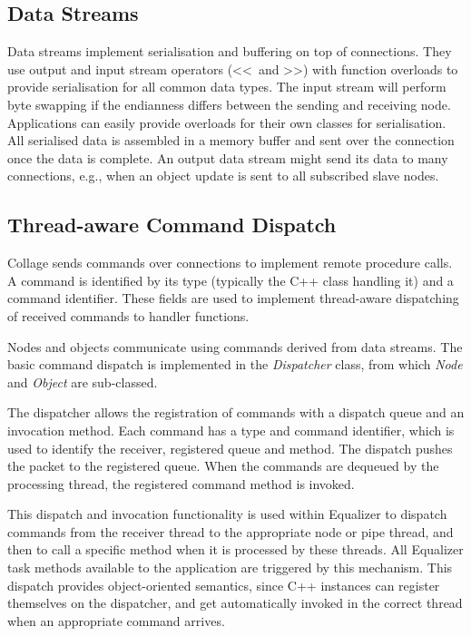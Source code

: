 \subsection{Data Streams}

Data streams implement serialisation and buffering on top of connections. They
use output and input stream operators (\textless\textless\ and
\textgreater\textgreater) with function overloads to provide serialisation for
all common data types. The input stream will perform byte swapping if the
endianness differs between the sending and receiving node. Applications can
easily provide overloads for their own classes for serialisation. All
serialised data is assembled in a memory buffer and sent over the connection
once the data is complete. An output data stream might send its data to many
connections, e.g., when an object update is sent to all subscribed slave nodes.

\subsection{Thread-aware Command Dispatch}

Collage sends commands over connections to implement remote procedure calls. A
command is identified by its type (typically the C++ class handling it) and a
command identifier. These fields are used to implement thread-aware dispatching
of received commands to handler functions.

Nodes and objects communicate using commands derived from data streams. The
basic command dispatch is implemented in the {\em Dispatcher} class, from
which {\em Node} and {\em Object} are sub-classed.

The dispatcher allows the registration of commands with a dispatch queue and an
invocation method. Each command has a type and command identifier, which is
used to identify the receiver, registered queue and method. The dispatch pushes
the packet to the registered queue. When the commands are dequeued by the
processing thread, the registered command method is invoked.

This dispatch and invocation functionality is used within Equalizer to dispatch
commands from the receiver thread to the appropriate node or pipe thread, and
then to call a specific method when it is processed by these threads. All
Equalizer task methods available to the application are triggered by this
mechanism. This dispatch provides object-oriented semantics, since C++
instances can register themselves on the dispatcher, and get automatically
invoked in the correct thread when an appropriate command arrives.

